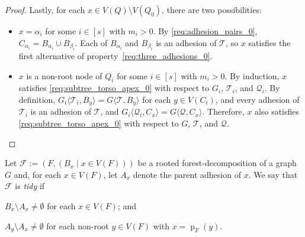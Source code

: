 \documentclass{patmorin}
\newcommand{\defin}[1]{\emph{\textcolor{brightmaroon}{#1}}}
\newcommand{\torso}[2]{{#1}\langle{#2}\rangle}
\DeclareMathOperator{\parent}{p}
\newcommand{\calF}{\mathcal{F}}
\newcommand{\calQ}{\mathcal{Q}}
\newcommand{\calT}{\mathcal{T}}
\begin{document}
\begin{proof}
  Lastly, for each $x\in V(Q)\setminus V(Q_0)$, there are two possibilities:
  \begin{itemize}[nosep,nolistsep]
    \item $x=\alpha_i$ for some $i\in[s]$ with $m_i>0$. By \ref{req:adhesion_pairs_0}, $C_{\alpha_i}=B_{\alpha_i}\cup B_{\beta_i}$. Each of $B_{\alpha_i}$ and $B_{\beta_i}$ is an adhesion of $\calT$, so $x$ satisfies the first alternative of property~\ref{req:three_adhesions_0}.
    \item $x$ is a non-root node of $Q_i$ for some $i\in[s]$ with $m_i>0$.  By induction, $x$ satisfies \ref{req:subtree_torso_apex_0} with respect to $G_i$, $\calT_i$, and $\calQ_i$. 
    By definition, $\torso{G_i}{\calT_i,B_y}=\torso{G}{\calT,B_y}$ for each $y\in V(C_i)$, and every adhesion of $\calT_i$ is an adhesion of $\calT$, and $\torso{G_i}{\calQ_i,C_x}=\torso{G}{\calQ,C_x}$. Therefore, $x$ also satisfies \ref{req:subtree_torso_apex_0} with respect to $G$, $\calT$, and $\calQ$. \qedhere
  \end{itemize}
\end{proof}


Let $\calF:=(F,(B_x\mid x\in V(F)))$ be a rooted forest-decomposition of a graph $G$ and, for each $x\in V(F)$, let $A_x$ denote the parent adhesion of $x$. We say that $\calF$ is \defin{tidy} if
\begin{enumerate*}[label=(\arabic*)]
  \item $B_x\setminus A_x\neq\emptyset$ for each $x\in V(F)$; and
  \item $A_y\setminus A_x\neq\emptyset$ for each non-root $y\in V(F)$ with $x=\parent_F(y)$.
\end{enumerate*}
\end{document}
